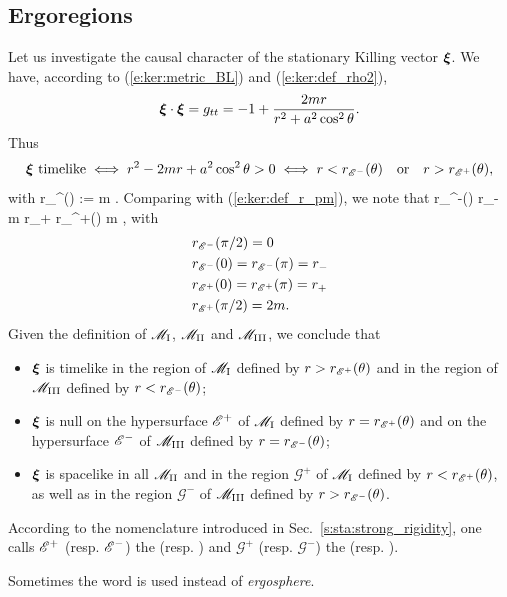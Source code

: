 \subsection{Ergoregions}

Let us investigate the causal character of the stationary Killing vector $\bm{\xi}$.
We have, according to (\ref{e:ker:metric_BL}) and (\ref{e:ker:def_rho2}),
\[
    \bm{\xi}\cdot\bm{\xi} = g_{tt} = - 1 + \frac{2m r}{r^2 + a^2\cos^2\theta} .
\]
Thus
\[
    \bm{\xi}\ \mbox{timelike} \iff r^2 - 2 m r + a^2\cos^2\theta > 0
        \iff r < r_{\mathscr{E}^-}(\theta) \quad\mbox{or}\quad  r > r_{\mathscr{E}^+}(\theta) ,
\]
with
\be
    r_{\E^\pm}(\theta) := m \pm {} .
\ee
Comparing with (\ref{e:ker:def_r_pm}), we note that
 \leq r_{\E^-}(\theta) \leq r_- \leq m \leq r_+ \leq r_{\E^+}(\theta)
         m ,
\ee
with
\begin{subequations}
\begin{align}
 & r_{\mathscr{E}^-}(\pi/2) = 0 \\
 & r_{\mathscr{E}^-}(0)  = r_{\mathscr{E}^-}(\pi) = r_- \\
 & r_{\mathscr{E}^+}(0)  = r_{\mathscr{E}^+}(\pi) = r_+ \\
 & r_{\mathscr{E}^+}(\pi/2) = 2 m .
\end{align}
\end{subequations}
Given the definition of $\mathscr{M}_{\rm I}$, $\mathscr{M}_{\rm II}$ and $\mathscr{M}_{\rm III}$, we conclude that
\begin{itemize}
\item $\bm{\xi}$ is timelike in the region of $\mathscr{M}_{\rm I}$ defined by $r>r_{\mathscr{E}^+}(\theta)$
and in the region of $\mathscr{M}_{\rm III}$ defined by $r<r_{\mathscr{E}^-}(\theta)$;
\item $\bm{\xi}$ is null on the hypersurface $\mathscr{E}^+$ of $\mathscr{M}_{\rm I}$ defined by
$r=r_{\mathscr{E}^+}(\theta)$
and on the hypersurface $\mathscr{E}^-$ of $\mathscr{M}_{\rm III}$ defined by $r=r_{\mathscr{E}^-}(\theta)$;
\item $\bm{\xi}$ is spacelike in all $\mathscr{M}_{\rm II}$ and in the region
$\mathscr{G}^+$ of $\mathscr{M}_{\rm I}$
defined by $r<r_{\mathscr{E}^+}(\theta)$, as well as
in the region $\mathscr{G}^-$ of $\mathscr{M}_{\rm III}$ defined by $r>r_{\mathscr{E}^-}(\theta)$.
\end{itemize}
According to the nomenclature introduced in Sec.~\ref{s:sta:strong_rigidity},
one calls $\mathscr{E}^+$ (resp. $\mathscr{E}^-$) the
(resp. )
and $\mathscr{G}^+$ (resp. $\mathscr{G}^-$) the
(resp. ).
\begin{remark}
Sometimes the word  is used instead of
\emph{ergosphere}.
\end{remark}

